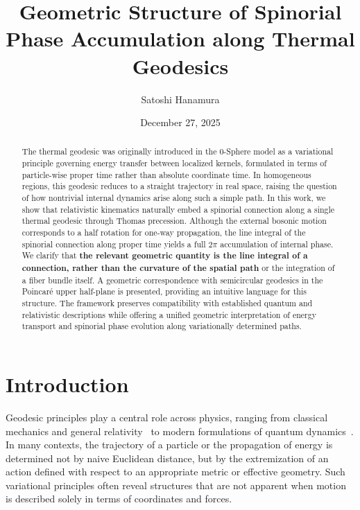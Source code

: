 \documentclass[%
 reprint,
 amsmath,amssymb,
 aps,
 prb,
]{revtex4-2}
\numberwithin{equation}{section}
\begin{document}
\title{Geometric Structure of Spinorial Phase Accumulation along Thermal Geodesics}

\author{Satoshi Hanamura}
\date{December 27, 2025}

\begin{abstract}
The thermal geodesic was originally introduced in the 0-Sphere model as a variational principle governing energy transfer between localized kernels, formulated in terms of particle-wise proper time rather than absolute coordinate time. 
In homogeneous regions, this geodesic reduces to a straight trajectory in real space, raising the question of how nontrivial internal dynamics arise along such a simple path. 
In this work, we show that relativistic kinematics naturally embed a spinorial connection along a single thermal geodesic through Thomas precession. 
Although the external bosonic motion corresponds to a half rotation for one-way propagation, the line integral of the spinorial connection along proper time yields a full $2\pi$ accumulation of internal phase. 
We clarify that \textbf{the relevant geometric quantity is the line integral of a connection, rather than the curvature of the spatial path} or the integration of a fiber bundle itself. 
A geometric correspondence with semicircular geodesics in the Poincaré upper half-plane is presented, providing an intuitive language for this structure. 
The framework preserves compatibility with established quantum and relativistic descriptions while offering a unified geometric interpretation of energy transport and spinorial phase evolution along variationally determined paths.
\end{abstract}

\maketitle

\section{Introduction}
\label{sec:introduction}

Geodesic principles play a central role across physics, ranging from classical mechanics and general relativity~\cite{misner1973,wald1984,weinberg1972} to modern formulations of quantum dynamics~\cite{feynman1949,peskin1995}. In many contexts, the trajectory of a particle or the propagation of energy is determined not by naive Euclidean distance, but by the extremization of an action defined with respect to an appropriate metric or effective geometry. Such variational principles often reveal structures that are not apparent when motion is described solely in terms of coordinates and forces.
\end{document}
